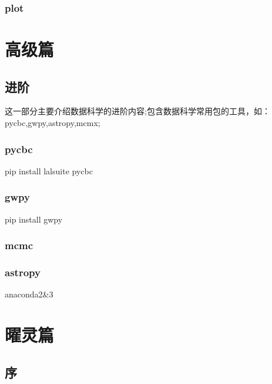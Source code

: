 \documentclass[letterpaper,10pt,english]{sphinxmanual}
\begin{document}
\subsection{plot}
\label{\detokenize{base/04_matplotlib:plot}}\label{\detokenize{base/04_matplotlib::doc}}

\chapter{高级篇}
\label{\detokenize{advanced/index::doc}}\label{\detokenize{advanced/index:id1}}

\section{进阶}
\label{\detokenize{advanced/index:id2}}
这一部分主要介绍数据科学的进阶内容;包含数据科学常用包的工具，如：
pycbc,gwpy,astropy,mcmx;


\subsection{pycbc}
\label{\detokenize{advanced/01_pycbc:pycbc}}\label{\detokenize{advanced/01_pycbc::doc}}
pip install lalsuite pycbc


\subsection{gwpy}
\label{\detokenize{advanced/02_gwpy::doc}}\label{\detokenize{advanced/02_gwpy:gwpy}}
pip install gwpy


\subsection{mcmc}
\label{\detokenize{advanced/03_mcmc:mcmc}}\label{\detokenize{advanced/03_mcmc::doc}}

\subsection{astropy}
\label{\detokenize{advanced/04_astropy:astropy}}\label{\detokenize{advanced/04_astropy::doc}}
anaconda2\&3


\chapter{曜灵篇}
\label{\detokenize{poem/index::doc}}\label{\detokenize{poem/index:id1}}

\section{序}
\label{\detokenize{poem/Preface::doc}}\label{\detokenize{poem/Preface:id1}}
\end{document}
